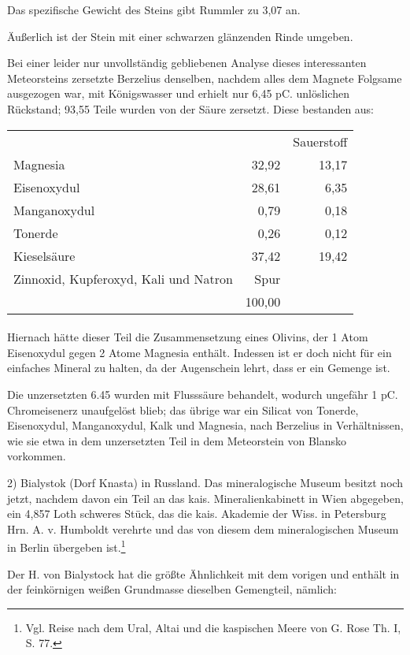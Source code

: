 \documentclass[a4paper, 11pt, oneside]{article}
\begin{document}
Das spezifische Gewicht des Steins gibt Rummler zu 3,07 an.

Äußerlich ist der Stein mit einer schwarzen glänzenden Rinde umgeben.

Bei einer leider nur unvollständig gebliebenen Analyse dieses interessanten Meteorsteins zersetzte Berzelius denselben, nachdem alles dem Magnete Folgsame ausgezogen war, mit Königswasser und erhielt nur 6,45 pC. unlöslichen Rückstand; 93,55 Teile wurden von der Säure zersetzt. Diese bestanden aus:
\begin{center}
\begin{tabular}{ l r r }
     & & Sauerstoff\\
    Magnesia & 32,92 & 13,17\\
    Eisenoxydul & 28,61 & 6,35\\
    Manganoxydul & 0,79 & 0,18\\
    Tonerde & 0,26 & 0,12\\
    Kieselsäure & 37,42 & 19,42\\  
    Zinnoxid, Kupferoxyd, Kali und Natron & Spur & \\  
     & 100,00 & \\
\end{tabular}
\end{center}
\paragraph{}
Hiernach hätte dieser Teil die Zusammensetzung eines Olivins, der 1 Atom Eisenoxydul gegen 2 Atome Magnesia enthält. Indessen ist er doch nicht für ein einfaches Mineral zu halten, da der Augenschein lehrt, dass er ein Gemenge ist.

Die unzersetzten 6.45 wurden mit Flusssäure behandelt, wodurch ungefähr 1 pC. Chromeisenerz unaufgelöst blieb; das übrige war ein Silicat von Tonerde, Eisenoxydul, Manganoxydul, Kalk und Magnesia, nach Berzelius in Verhältnissen, wie sie etwa in dem unzersetzten Teil in dem Meteorstein von Blansko vorkommen.

2) Bialystok (Dorf Knasta) in Russland. Das mineralogische Museum besitzt noch jetzt, nachdem davon ein Teil an das kais. Mineralienkabinett in Wien abgegeben, ein 4,857 Loth schweres Stück, das die kais. Akademie der Wiss. in Petersburg Hrn. A. v. Humboldt verehrte und das von diesem dem mineralogischen Museum in Berlin übergeben ist.\footnote{Vgl. Reise nach dem Ural, Altai und die kaspischen Meere von G. Rose Th. I, S. 77.}

Der H. von Bialystock hat die größte Ähnlichkeit mit dem vorigen und enthält in der feinkörnigen weißen Grundmasse dieselben Gemengteil, nämlich:
\end{document}
